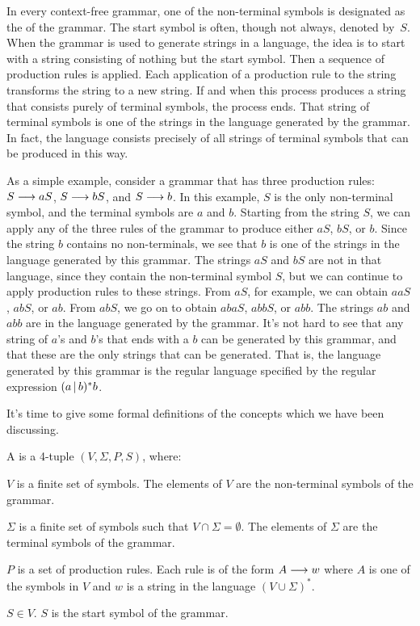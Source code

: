In every context-free grammar, one of the non-terminal symbols is
designated as the  of the grammar.  The start symbol
is often, though not always, denoted by~$S$.  When the grammar
is used to generate strings in a language, the idea is to start
with a string consisting of nothing but the start symbol.  Then
a sequence of production rules is applied.  Each application of
a production rule to the string transforms the string to a new
string.  If and when this process produces a string that consists
purely of terminal symbols, the process ends.  That string of
terminal symbols is one of the strings in the language generated
by the grammar.  In fact, the language consists precisely of
all strings of terminal symbols that can be produced in this way.

As a simple example, consider a grammar that has three production
rules: $S\longrightarrow aS$, $S\longrightarrow bS$, and $S\longrightarrow b$.
In this example, $S$ is the only non-terminal symbol, and
the terminal symbols are $a$ and $b$.  Starting from the
string $S$, we can apply any of the three rules of the grammar
to produce either $aS$, $bS$, or $b$.  Since the string $b$ contains
no non-terminals, we see that $b$ is one of the strings in the language
generated by this grammar.  The strings $aS$ and $bS$ are not in
that language, since they contain the non-terminal symbol $S$,
but we can continue to apply production rules to these strings.
From $aS$, for example, we can obtain $aaS$, $abS$, or $ab$.
From $abS$, we go on to obtain $abaS$, $abbS$, or $abb$.
The strings $ab$ and $abb$ are in the language generated by
the grammar.  It's not hard to see that any string of $a$'s and
$b$'s that ends with a $b$ can be generated by this grammar,
and that these are the only strings that can be generated.
That is, the language generated by this grammar is the regular
language specified by the regular expression $(a\hbox{$\,|\,$} b)^{*}b$.

It's time to give some formal definitions of the concepts which
we have been discussing.

\begin{definition}
A  is a 4-tuple $(V,\Sigma,P,S)$,
where:

$V$ is a finite set of symbols.  The elements of $V$
are the non-terminal symbols of the grammar.

$\Sigma$ is a finite set of symbols such that $V\cap\Sigma=\emptyset$.
The elements of $\Sigma$ are the terminal symbols of the grammar.

$P$ is a set of production rules.  Each rule is of the
form $A\longrightarrow w$ where $A$ is one of the symbols in $V$ and
$w$ is a string in the language $(V\cup\Sigma)^*$.

$S\in V$.  $S$ is the start symbol of the grammar.

\end{definition}

